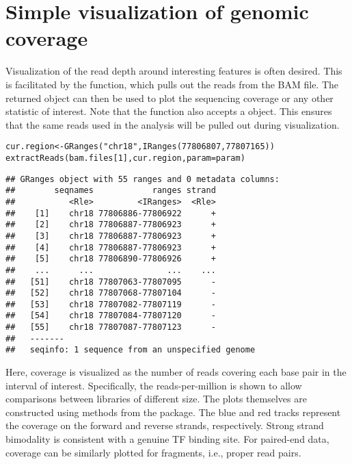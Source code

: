 \documentclass{report}\usepackage[]{graphicx}\usepackage[usenames,dvipsnames]{color}
\newcommand{\hlnum}[1]{\textcolor[rgb]{0.816,0.125,0.439}{#1}}%
\newcommand{\hlstr}[1]{\textcolor[rgb]{0.251,0.627,0.251}{#1}}%
\newcommand{\hlstd}[1]{\textcolor[rgb]{0.251,0.251,0.251}{#1}}%
\newcommand{\hlkwb}[1]{\textcolor[rgb]{0,0,0}{#1}}%
\newcommand{\hlkwc}[1]{\textcolor[rgb]{0.251,0.251,0.251}{#1}}%
\newcommand{\hlkwd}[1]{\textcolor[rgb]{0.878,0.439,0.125}{#1}}%
\newenvironment{knitrout}{}{} %
\begin{document}
\section{Simple visualization of genomic coverage}
Visualization of the read depth around interesting features is often desired.
This is facilitated by the  function, which pulls out the reads from the BAM file.
The returned  object can then be used to plot the sequencing coverage or any other statistic of interest.
Note that the  function also accepts a  object.
This ensures that the same reads used in the analysis will be pulled out during visualization.

\begin{knitrout}
\color{fgcolor}\begin{kframe}
\begin{alltt}
\hlstd{cur.region} \hlkwb{<-} \hlkwd{GRanges}\hlstd{(}\hlstr{"chr18"}\hlstd{,} \hlkwd{IRanges}\hlstd{(}\hlnum{77806807}\hlstd{,} \hlnum{77807165}\hlstd{))}
\hlkwd{extractReads}\hlstd{(bam.files[}\hlnum{1}\hlstd{], cur.region,} \hlkwc{param}\hlstd{=param)}
\end{alltt}
\begin{verbatim}
## GRanges object with 55 ranges and 0 metadata columns:
##        seqnames            ranges strand
##           <Rle>         <IRanges>  <Rle>
##    [1]    chr18 77806886-77806922      +
##    [2]    chr18 77806887-77806923      +
##    [3]    chr18 77806887-77806923      +
##    [4]    chr18 77806887-77806923      +
##    [5]    chr18 77806890-77806926      +
##    ...      ...               ...    ...
##   [51]    chr18 77807063-77807095      -
##   [52]    chr18 77807068-77807104      -
##   [53]    chr18 77807082-77807119      -
##   [54]    chr18 77807084-77807120      -
##   [55]    chr18 77807087-77807123      -
##   -------
##   seqinfo: 1 sequence from an unspecified genome
\end{verbatim}
\end{kframe}
\end{knitrout}

Here, coverage is visualized as the number of reads covering each base pair in the interval of interest.
Specifically, the reads-per-million is shown to allow comparisons between libraries of different size.
The plots themselves are constructed using methods from the  package.
The blue and red tracks represent the coverage on the forward and reverse strands, respectively. 
Strong strand bimodality is consistent with a genuine TF binding site.
For paired-end data, coverage can be similarly plotted for fragments, i.e., proper read pairs.
\end{document}
